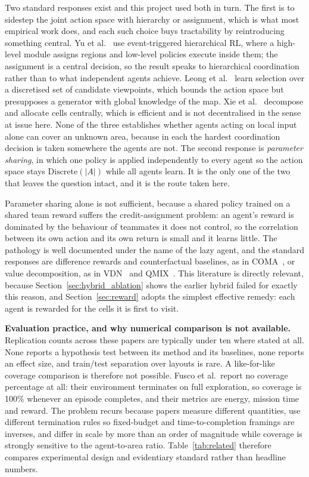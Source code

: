 \documentclass[a4paper, 10pt, conference]{ieeeconf}
\begin{document}
Two standard responses exist and this project used both in turn. The
first is to sidestep the joint action space with hierarchy or
assignment, which is what most empirical work does, and each such
choice buys tractability by reintroducing something central.
Yu et al.~\cite{yu2025} use event-triggered hierarchical RL, where a
high-level module assigns regions and low-level policies execute
inside them; the assignment is a central decision, so the result
speaks to hierarchical coordination rather than to what independent
agents achieve. Leong et al.~\cite{leong2024} learn selection over a
discretised set of candidate viewpoints, which bounds the action space
but presupposes a generator with global knowledge of the map.
Xie et al.~\cite{xie2025} decompose and allocate cells centrally,
which is efficient and is not decentralised in the sense at issue
here. None of the three establishes whether agents acting on local
input alone can cover an unknown area, because in each the hardest
coordination decision is taken somewhere the agents are not. The
second response is \emph{parameter sharing}, in which one policy is
applied independently to every agent so the action space stays
$\text{Discrete}(|A|)$ while all agents learn. It is the only one of
the two that leaves the question intact, and it is the route taken
here.

Parameter sharing alone is not sufficient, because a shared policy
trained on a shared team reward suffers the credit-assignment problem:
an agent's reward is dominated by the behaviour of teammates it does
not control, so the correlation between its own action and its own
return is small and it learns little. The pathology is well documented
under the name of the lazy agent, and the standard responses are
difference rewards and counterfactual baselines, as in
COMA~\cite{foerster2018}, or value decomposition, as in
VDN~\cite{sunehag2018} and QMIX~\cite{rashid2018}. This literature is
directly relevant, because Section~\ref{sec:hybrid_ablation} shows the
earlier hybrid failed for exactly this reason, and
Section~\ref{sec:reward} adopts the simplest effective remedy: each
agent is rewarded for the cells it is first to visit.

\textbf{Evaluation practice, and why numerical comparison is not
available.} Replication counts across these papers are typically under
ten where stated at all. None reports a hypothesis test between its
method and its baselines, none reports an effect size, and train/test
separation over layouts is rare. A like-for-like coverage comparison
is therefore not possible. Fusco et al.\ report no coverage percentage
at all: their environment terminates on full exploration, so coverage
is 100\% whenever an episode completes, and their metrics are energy,
mission time and reward. The problem recurs because papers measure
different quantities, use different termination rules so fixed-budget
and time-to-completion framings are inverses, and differ in scale by
more than an order of magnitude while coverage is strongly sensitive
to the agent-to-area ratio. Table~\ref{tab:related} therefore compares
experimental design and evidentiary standard rather than headline
numbers.
\end{document}
